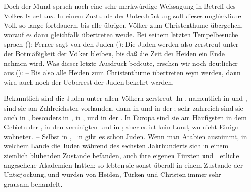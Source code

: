 \begin{aufza}
\item Doch der Mund  sprach noch eine sehr merkwürdige Weissagung in Betreff des Volkes Israel aus. In einem Zustande der Unterdrückung soll dieses unglückliche Volk so lange fortdauern, bis alle übrigen Völker zum Christenthume übergehen, worauf es dann gleichfalls übertreten werde. Bei seinem letzten Tempelbesuche sprach  ():  Ferner sagt  von den Juden ():  Die Juden werden also zerstreut unter der Botmäßigkeit der Völker bleiben, bis daß die Zeit der Heiden ein Ende nehmen wird. Was dieser letzte Ausdruck bedeute, ersehen wir noch deutlicher aus  ():  -- Bis also alle Heiden zum Christenthume übertreten seyn werden, dann wird auch noch der Ueberrest der Juden bekehrt werden.
\item Bekanntlich sind die Juden unter allen Völkern zerstreut. In , namentlich in  und , sind sie am Zahlreichsten vorhanden, dann in  und in der ; sehr zahlreich sind sie auch in , besonders in , in , und in der . In Europa sind sie am Häufigsten in dem Gebiete der , in den vereinigten  und in ; aber es ist kein Land, wo nicht Einige wohneten. -- Selbst in , \zB\ in  gibt es schon Juden. Wenn man Arabien ausnimmt, in welchem Lande die Juden während des sechsten Jahrhunderts sich in einem ziemlich blühenden Zustande befanden, auch ihre eigenen Fürsten und~\ etliche angesehene Akademien hatten: so lebten sie sonst überall in einem Zustande der Unterjochung, und wurden von Heiden, Türken und Christen immer sehr grausam behandelt.

\end{aufza}
